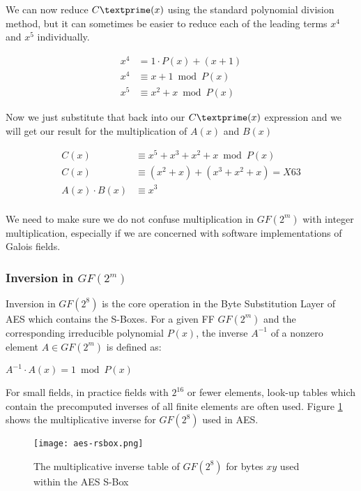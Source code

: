 We can now reduce $C\textprime(x)$ using the standard polynomial division method, but it can sometimes be easier to reduce each of the leading terms $x^4$ and $x^5$ individually.

\begin{center}
\begin{align*}
x^4 &= 1 \cdot P(x) + (x+1)\\
x^4 &\equiv x + 1 \bmod P(x) \\
x^5 &\equiv x^2 + x \bmod P(x)
\end{align*}
\end{center} 

Now we just substitute that back into our $C\textprime(x)$ expression and we will get our result for the multiplication of $A(x)$ and $B(x)$

\begin{center}
\begin{align*}
C(x) &\equiv x^5 + x^3 + x^2 + x \bmod P(x) \\
C(x) &\equiv (x^2 + x) + (x^3 + x^2 + x) = X63 \\
A(x) \cdot B(x) &\equiv x^3 \\
\end{align*}
\end{center}

We need to make sure we do not confuse multiplication in $GF(2^m)$ with integer multiplication, especially if we are concerned with software implementations of Galois fields.

\subsubsection{Inversion in $GF(2^m)$}

Inversion in $GF(2^8)$ is the core operation in the Byte Substitution Layer of AES which contains the S-Boxes. For a given FF $GF(2^m)$ and the corresponding irreducible polynomial $P(x)$, the inverse $A^{-1}$ of a nonzero element $A \in GF(2^m)$ is defined as:

\begin{center}
$A^{-1} \cdot A(x) = 1 \bmod P(x)$
\end{center}

For small fields, in practice fields with $2^16$ or fewer elements, look-up tables which contain the precomputed inverses of all finite elements are often used. Figure \ref{AES-RS-BOX} shows the multiplicative inverse for $GF(2^8)$ used in AES.

\begin{figure}[h!]
\begin{center}
\texttt{[image: aes-rsbox.png]}
\caption{The multiplicative inverse table of $GF(2^8)$ for bytes $xy$ used within the AES S-Box}
\label{AES-RS-BOX}
\end{center}
\end{figure}

